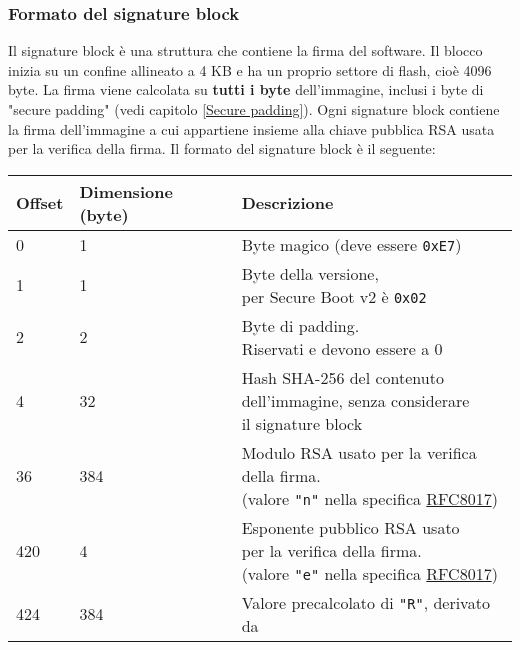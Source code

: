 \documentclass[a4paper]{article}
\begin{document}
\subsubsection{Formato del signature block}
Il signature block è una struttura che contiene la firma del software.
Il blocco inizia su un confine allineato a 4 KB e ha un proprio settore di flash,
cioè 4096 byte. La firma viene calcolata su \textbf{tutti i byte} dell'immagine,
inclusi i byte di "secure padding" (vedi capitolo \ref{Secure padding}).
Ogni signature block contiene la firma dell'immagine a cui appartiene insieme alla
chiave pubblica RSA usata per la verifica della firma.
Il formato del signature block è il seguente:
\begin{table}[H]
  \centering
  \begin{tabular}{|l|l|l|}
    \hline
    \textbf{Offset} & \textbf{Dimensione (byte)} & \textbf{Descrizione} \\
    \hline
      0 & 1 & Byte magico (deve essere \texttt{0xE7})\\
    \hline
      1 & 1 & \makecell[l]{
        Byte della versione,\\
        per Secure Boot v2 è \texttt{0x02}
      } \\
    \hline
      2 & 2 &
      \makecell[l]{
        Byte di padding.\\
        Riservati e devono essere a 0
      } \\
    \hline
      4 & 32 & \makecell[l]{
        Hash SHA-256 del contenuto \\
        dell'immagine, senza considerare \\
        il signature block
      } \\
    \hline
      36 & 384 & \makecell[l]{
        Modulo RSA usato per la verifica \\
        della firma. \\
        (valore \texttt{"n"} nella specifica
        \href{https://www.rfc-editor.org/rfc/rfc8017.html}{RFC8017})
      } \\
    \hline
      420 & 4 & \makecell[l]{
        Esponente pubblico RSA usato \\
        per la verifica della firma. \\
        (valore \texttt{"e"} nella specifica
        \href{https://www.rfc-editor.org/rfc/rfc8017.html}{RFC8017})
      } \\
    \hline
      424 & 384 & \makecell[l]{
        Valore precalcolato di \texttt{"R"}, derivato da \\
}
\end{tabular}
\end{table}
\end{document}
